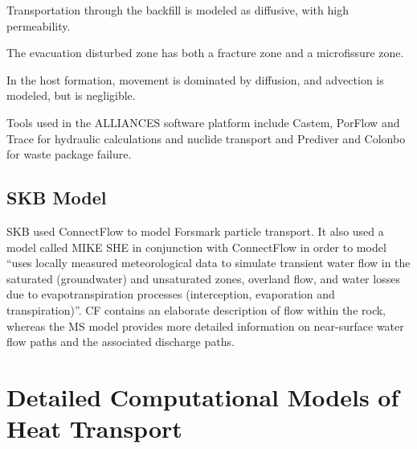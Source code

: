 Transportation through the backfill is modeled as diffusive, with high 
permeability.

The evacuation disturbed zone has both a fracture zone and a 
microfissure zone.

In the host formation, movement is dominated by diffusion, and 
advection is modeled, but is negligible.


%

Tools used in the ALLIANCES software platform include Castem, PorFlow 
and Trace for hydraulic calculations and nuclide transport and 
Prediver and Colonbo for waste package failure.

\subsection{SKB Model}
SKB used ConnectFlow to model Forsmark particle transport. It also 
used a model called MIKE SHE in conjunction with ConnectFlow in order 
to model ``uses locally measured meteorological data to simulate 
transient water flow in the saturated (groundwater) and unsaturated 
zones, overland flow, and water losses due to evapotranspiration 
processes (interception, evaporation and transpiration)''. CF contains 
an elaborate description of flow within the rock, whereas the MS model 
provides more detailed information on near-surface water flow paths 
and the associated discharge paths.



\section{Detailed Computational Models of Heat Transport}
\label{sec:detailed_heat}

